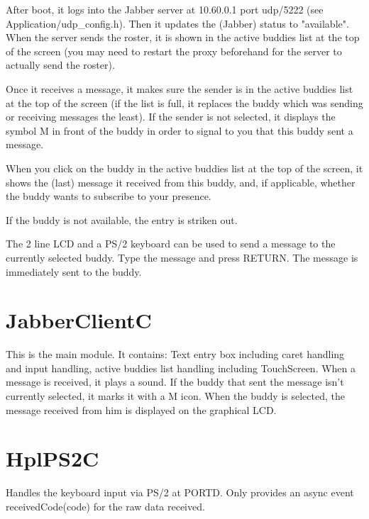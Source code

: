 \documentclass[12pt,a4paper,titlepage,oneside]{article}
\begin{document}
After boot, it logs into the Jabber server at 10.60.0.1 port udp/5222 (see
Application/udp\_config.h). Then it updates the (Jabber) status to "available". When the
server sends the roster, it is shown in the active buddies list at the top of
the screen (you may need to restart the proxy beforehand for the server to actually send the roster).\par

Once it receives a message, it makes sure the sender is in the active
buddies list at the top of the screen (if the list is full, it replaces the
buddy which was sending or receiving messages the least). If the sender is
not selected, it displays the symbol M in front of the buddy in order to
signal to you that this buddy sent a message.\par

When you click on the buddy in the
active buddies list at the top of the screen, it shows the (last) message it
received from this buddy, and, if applicable, whether the buddy wants to
subscribe to your presence.\par

If the buddy is not available, the entry is striken out.\par

The 2 line LCD and a PS/2 keyboard can be used to send a message to the
currently selected buddy. Type the message and press RETURN. The message
is immediately sent to the buddy.

\section{JabberClientC}

This is the main module. It contains: Text entry box including caret handling and input handling, active buddies list handling including TouchScreen.
When a message is received, it plays a sound. If the buddy that sent the message isn't currently selected, it marks it with a M icon.
When the buddy is selected, the message received from him is displayed on the graphical LCD.

\section{HplPS2C}

Handles the keyboard input via PS/2 at PORTD. Only provides an async event receivedCode(code) for the raw data received.
\end{document}

